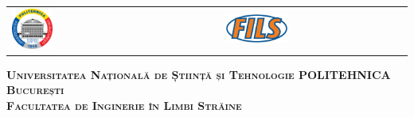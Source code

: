 



\begin{titlepage}
	\centering
	\begin{tabular}{p{5cm}p{5.6cm}}
		\includegraphics[width=0.2\textwidth]{img/upb.png} &
		\includegraphics[width=0.35\textwidth]{img/fils.png}
	\end{tabular}
	\vspace{1cm}

	{\scshape\Large \textbf{Universitatea Națională de Știință și Tehnologie POLITEHNICA București} \\}
	{\scshape\Large \textbf{Facultatea de Inginerie în Limbi Străine} \\}
	
\end{titlepage}

